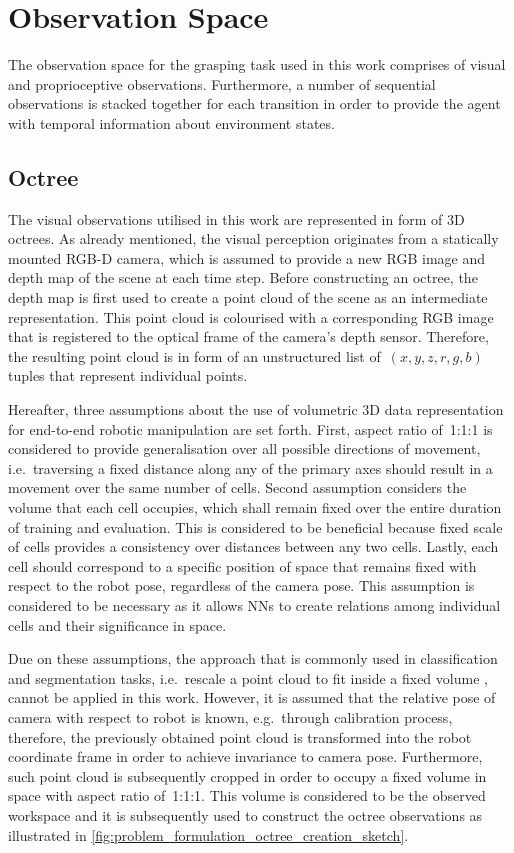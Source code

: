 \section{Observation Space}

The observation space for the grasping task used in this work comprises of visual and proprioceptive observations. Furthermore, a number of sequential observations is stacked together for each transition in order to provide the agent with temporal information about environment states.


\subsection{Octree}

The visual observations utilised in this work are represented in form of 3D octrees. As already mentioned, the visual perception originates from a statically mounted RGB-D camera, which is assumed to provide a new RGB image and depth map of the scene at each time step. Before constructing an octree, the depth map is first used to create a point cloud of the scene as an intermediate representation. This point cloud is colourised with a corresponding RGB image that is registered to the optical frame of the camera's depth sensor. Therefore, the resulting point cloud is in form of an unstructured list of~\((x,y,z,r,g,b)\) tuples that represent individual points.

Hereafter, three assumptions about the use of volumetric 3D data representation for end-to-end robotic manipulation are set forth. First, aspect ratio of~1:1:1 is considered to provide generalisation over all possible directions of movement, i.e.~traversing a fixed distance along any of the primary axes should result in a movement over the same number of cells. Second assumption considers the volume that each cell occupies, which shall remain fixed over the entire duration of training and evaluation. This is considered to be beneficial because fixed scale of cells provides a consistency over distances between any two cells. Lastly, each cell should correspond to a specific position of space that remains fixed with respect to the robot pose, regardless of the camera pose. This assumption is considered to be necessary as it allows NNs to create relations among individual cells and their significance in space.

Due on these assumptions, the approach that is commonly used in classification and segmentation tasks, i.e.~rescale a point cloud to fit inside a fixed volume \cite{wang_o-cnn_2017}, cannot be applied in this work. However, it is assumed that the relative pose of camera with respect to robot is known, e.g.~through calibration process, therefore, the previously obtained point cloud is transformed into the robot coordinate frame in order to achieve invariance to camera pose. Furthermore, such point cloud is subsequently cropped in order to occupy a fixed volume in space with aspect ratio of~1:1:1. This volume is considered to be the observed workspace and it is subsequently used to construct the octree observations as illustrated in \autoref{fig:problem_formulation_octree_creation_sketch}.


